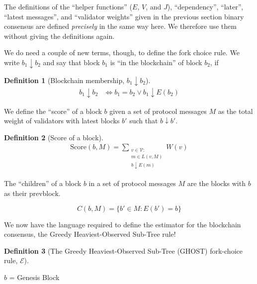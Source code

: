 \documentclass{article}
\theoremstyle{definition}
\newtheorem{defn}{Definition}[section]
\begin{document}
The definitions of the ``helper functions'' ($E$, $V$, and $J$), ``dependency'', ``later'', ``latest messages'', and ``validator weights'' given in the previous section binary consensus are defined \emph{precisely} in the same way here. We therefore use them without giving the definitions again.

We do need a couple of new terms, though, to define the fork choice rule. We write $b_1 \downarrow b_2$ and say that block $b_1$ is ``in the blockchain'' of block $b_2$, if

\begin{defn}[Blockchain membership, $b_1 \downarrow b_2$]
\begin{align}
  b_1 \downarrow b_2 &\iff b_1 = b_2 \lor b_1 \downarrow E(b_2)
\end{align}
\end{defn}

We define the ``score'' of a block $b$ given a set of protocol messages $M$ as the total weight of validators with latest blocks $b'$ such that $b \downarrow b'$.

\begin{defn}[Score of a block]
\begin{align}
\text{Score}(b, M) = \sum_{\substack{v \in \mathcal{V} : \\ m \in L(v,M) \\ b \downarrow E(m)}} W(v)
\end{align}
\end{defn}

The ``children'' of a block $b$ in a set of protocol messages $M$ are the blocks with $b$ as their prevblock.

$$
C(b,M) = \{b' \in M : E(b') = b\}
$$

We now have the language required to define the estimator for the blockchain consensus, the Greedy Heaviest-Observed Sub-Tree rule!
\begin{defn}[The Greedy Heaviest-Observed Sub-Tree (GHOST) fork-choice rule, $\mathcal{E}$]
\end{defn}

\begin{algorithm}[H]
 $b$ = Genesis Block


\caption{The Greedy Heaviest-Observed Sub-tree Fork-choice rule, $\mathcal{E}$}
\end{algorithm}
\end{document}
